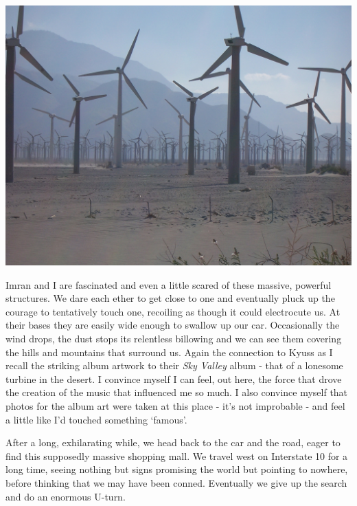 \documentclass[a5paper,titlepage,11pt]{book}
\begin{document}
\begin{center}\includegraphics[width=\textwidth]{gfx/100_1636}\end{center}

Imran and I are fascinated and even a little scared of these massive, powerful structures. We dare each ether to get close to one and eventually pluck up the courage to tentatively touch one, recoiling as though it could electrocute us. At their bases they are easily wide enough to swallow up our car. Occasionally the wind drops, the dust stops its relentless billowing and we can see them covering the hills and mountains that surround us. Again the connection to Kyuss as I recall the striking album artwork to their \emph{Sky Valley} album - that of a lonesome turbine in the desert. I convince myself I can feel, out here, the force that drove the creation of the music that influenced me so much. I also convince myself that photos for the album art were taken at this place - it's not improbable - and feel a little like I'd touched something `famous'.

After a long, exhilarating while, we head back to the car and the road, eager to find this supposedly massive shopping mall. We travel west on Interstate 10 for a long time, seeing nothing but signs promising the world but pointing to nowhere, before thinking that we may have been conned. Eventually we give up the search and do an enormous U-turn.
\end{document}
